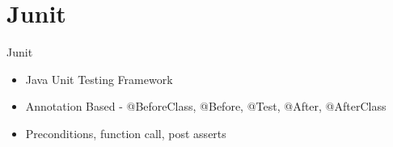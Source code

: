 \section{Junit}

\begin{frame}[fragile]{Junit}
\begin{itemize}
    \item Java Unit Testing Framework
    \item Annotation Based - @BeforeClass, @Before, @Test, @After, @AfterClass
    \item Preconditions, function call, post asserts
\end{itemize}
\end{frame}